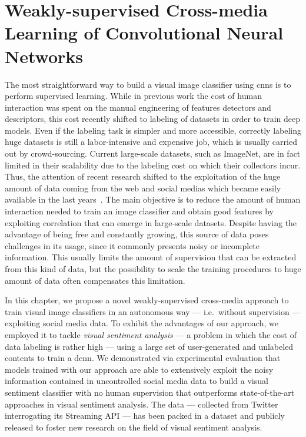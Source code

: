 
\graphicspath{{img/vsa/}}

\newcommand{\NomeInitialDatset}{XX}
\newcommand{\NID}{XX}
\newcommand{\NomeTSA}{Twitter for Sentiment Analysis}
\newcommand{\TSA}{T4SA}
\newcommand{\BTSA}{B-T4SA}
\newcommand{\ourFtAlex}{Hybrid-T4SA}
\newcommand{\ourFtVGG}{VGG-T4SA}

\chapter{Weakly-supervised Cross-media Learning of Convolutional Neural Networks}
\label{ch:cross-media}

The most straightforward way to build a visual image classifier using \glspl{cnn} is to perform supervised learning.
While in previous work the cost of human interaction was spent on the manual engineering of features detectors and descriptors, this cost recently shifted to labeling of datasets in order to train deep models.
Even if the labeling task is simpler and more accessible, correctly labeling huge datasets is still a labor-intensive and expensive job, which is usually carried out by crowd-sourcing.
Current large-scale datasets, such as ImageNet, are in fact limited in their scalability due to the labeling cost on which their collectors incur.
Thus, the attention of recent research shifted to the exploitation of the huge amount of data coming from the web and social medias which became easily available in the last years~\cite{sun2017revisiting,mahajan2018exploring}. %
The main objective is to reduce the amount of human interaction needed to train an image classifier and obtain good features by exploiting correlation that can emerge in large-scale datasets.
Despite having the advantage of being free and constantly growing, this source of data poses challenges in its usage, since it commonly presents noisy or incomplete information.
This usually limits the amount of supervision that can be extracted from this kind of data, but the possibility to scale the training procedures to huge amount of data often compensates this limitation.

In this chapter, we propose a novel weakly-supervised cross-media approach to train visual image classifiers in an autonomous way --- i.e.\ without supervision --- exploiting social media data.%
To exhibit the advantages of our approach, we employed it to tackle \emph{visual sentiment analysis} --- a problem in which the cost of data labeling is rather high --- using a large set of user-generated and unlabeled contents to train a \acrfull{dcnn}.
We demonstrated via experimental evaluation that models trained with our approach are able to extensively exploit the noisy information contained in uncontrolled social media data to build a visual sentiment classifier with no human supervision that outperforms state-of-the-art approaches in visual sentiment analysis.
The data --- collected from Twitter interrogating its Streaming API --- has been packed in a dataset and publicly released to foster new research on the field of visual sentiment analysis.

